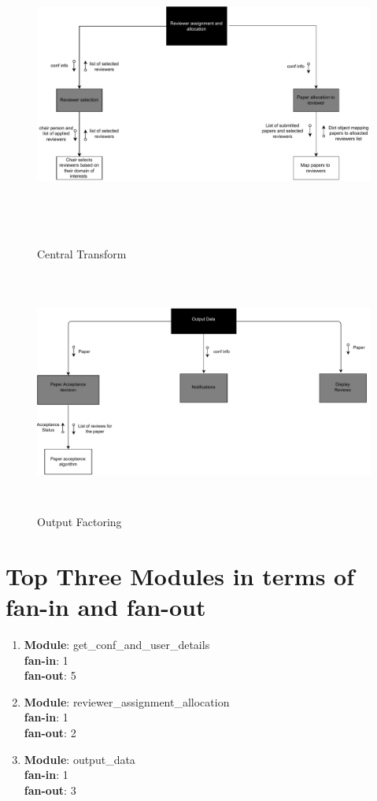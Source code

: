 \documentclass[english,a4paper,12pt]{report}
\begin{document}
\begin{figure}[h!]
\centering
\includegraphics[width=18cm,height=10cm]{SD-Images/Central_transform.pdf}  
\caption{Central Transform}
\end{figure}

\begin{figure}[h!]
\centering
\includegraphics[width=18cm,height=8cm]{SD-Images/output-factoring.pdf}  
\caption{Output Factoring}
\end{figure}

\section{Top Three Modules in terms of fan-in and fan-out}

\begin{enumerate}
    \item \textbf{Module}: get\_conf\_and\_user\_details\\ 
   \textbf{ fan-in}: 1 \\ 
    \textbf{fan-out}: 5 
    \item \textbf{Module}: reviewer\_assignment\_allocation \\ 
    \textbf{fan-in}: 1 \\ 
    \textbf{fan-out}: 2 
    \item \textbf{Module}: output\_data \\ 
    \textbf{fan-in}: 1 \\ 
    \textbf{fan-out}: 3 
\end{enumerate}
\end{document}
